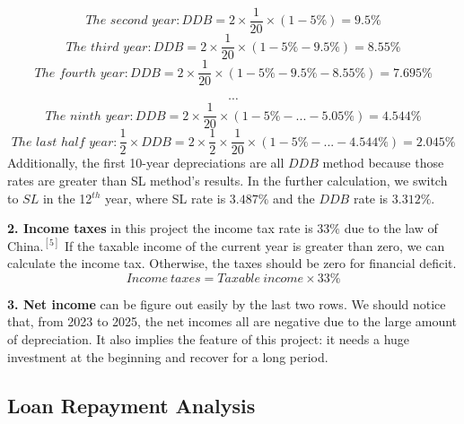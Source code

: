 \documentclass[12pt]{article}
\begin{document}
\begin{equation}\label{}
The\,\,second\,\,year: DDB=2\times \frac{1}{20}\times \left( 1-\text{5\%} \right) =\text{9.5\%}
\end{equation}
 \begin{equation}\label{}
The\,\,third\,\,year: DDB=2\times \frac{1}{20}\times \left( 1-\text{5\%}-\text{9.5\%} \right) =\text{8.55\%}
 \end{equation}
 \begin{equation}\label{}
The\,\,fourth\,\,year: DDB=2\times \frac{1}{20}\times \left( 1-\text{5\%}-\text{9.5\%}-\text{8.55\%} \right) =\text{7.695\%}
 \end{equation}

$$\cdots$$
\begin{equation}\label{}
The\,\,ninth\,\,year: DDB=2\times \frac{1}{20}\times \left( 1-\text{5\%}-...-\text{5.05\%} \right) =\text{4.544\%}
\end{equation}
\begin{equation}\label{}
The\,\,last\,\,half\,\,year: \frac{1}{2}\times DDB=2\times \frac{1}{2}\times \frac{1}{20}\times \left( 1-\text{5\%}-...-\text{4.544\%} \right) =\text{2.045\%}
\end{equation}
Additionally, the first 10-year depreciations are all $DDB$ method because those rates are greater than SL method’s results. In the further calculation, we switch to $SL$ in the 12$^{th}$ year, where SL rate is $3.487\%$ and the $DDB$ rate is $3.312\%$.
\par {\bfseries 2. Income taxes} in this project the income tax rate is $33\%$ due to the law of China.$^{[5]}$  If the taxable income of the current year is greater than zero, we can calculate the income tax. Otherwise, the taxes should be zero for financial deficit.
\begin{equation}\label{}
  Income\ taxes=Taxable\ income\times33\%
\end{equation}
\par {\bfseries 3. Net income} can be figure out easily by the last two rows. We should notice that, from 2023 to 2025, the net incomes all are negative due to the large amount of depreciation. It also implies the feature of this project: it needs a huge investment at the beginning and recover for a long period.

\subsection{Loan Repayment Analysis}
\end{document}
